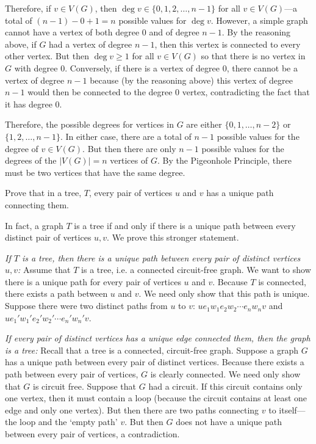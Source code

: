 \documentclass[11pt,letterpaper]{article}
\begin{document}
Therefore, if $v \in V(G)$, then $\deg v \in \{ 0, 1, 2, \ldots, n - 1 \}$ for all $v \in V(G)$---a total of $(n - 1) - 0 + 1= n$ possible values for $\deg v$. However, a simple graph cannot have a vertex of both degree $0$ and of degree $n - 1$. By the reasoning above, if $G$ had a vertex of degree $n - 1$, then this vertex is connected to every other vertex. But then $\deg v \geq 1$ for all $v \in V(G)$ so that there is no vertex in $G$ with degree $0$. Conversely, if there is a vertex of degree $0$, there cannot be a vertex of degree $n - 1$ because (by the reasoning above) this vertex of degree $n - 1$ would then be connected to the degree $0$ vertex, contradicting the fact that it has degree $0$. \pspace

Therefore, the possible degrees for vertices in $G$ are either $\{ 0, 1, \ldots, n - 2 \}$ or $\{ 1, 2, \ldots, n - 1 \}$. In either case, there are a total of $n - 1$ possible values for the degree of $v \in V(G)$. But then there are only $n - 1$ possible values for the degrees of the $|V(G)|= n$ vertices of $G$. By the Pigeonhole Principle, there must be two vertices that have the same degree.



\newpage



 Prove that in a tree, $T$, every pair of vertices $u$ and $v$ has a unique path connecting them. \pspace

\sol In fact, a graph $T$ is a tree if and only if there is a unique path between every distinct pair of vertices $u, v$. We prove this stronger statement. \pspace

{\itshape If $T$ is a tree, then there is a unique path between every pair of distinct vertices $u, v$:} Assume that $T$ is a tree, i.e. a connected circuit-free graph. We want to show there is a unique path for every pair of vertices $u$ and $v$. Because $T$ is connected, there exists a path between $u$ and $v$. We need only show that this path is unique. Suppose there were two distinct paths from $u$ to $v$: $u e_1 w_1 e_2 w_2 \cdots e_n w_n v$ and $u e_1' w_1' e_2' w_2' \cdots e_n' w_n' v$. 
















\newpage


{\itshape If every pair of distinct vertices has a unique edge connected them, then the graph is a tree:} Recall that a tree is a connected, circuit-free graph. Suppose a graph $G$ has a unique path between every pair of distinct vertices. Because there exists a path between every pair of vertices, $G$ is clearly connected. We need only show that $G$ is circuit free. Suppose that $G$ had a circuit. If this circuit contains only one vertex, then it must contain a loop (because the circuit contains at least one edge and only one vertex). But then there are two paths connecting $v$ to itself---the loop and the `empty path' $v$. But then $G$ does not have a unique path between every pair of vertices, a contradiction. \pspace
\end{document}
